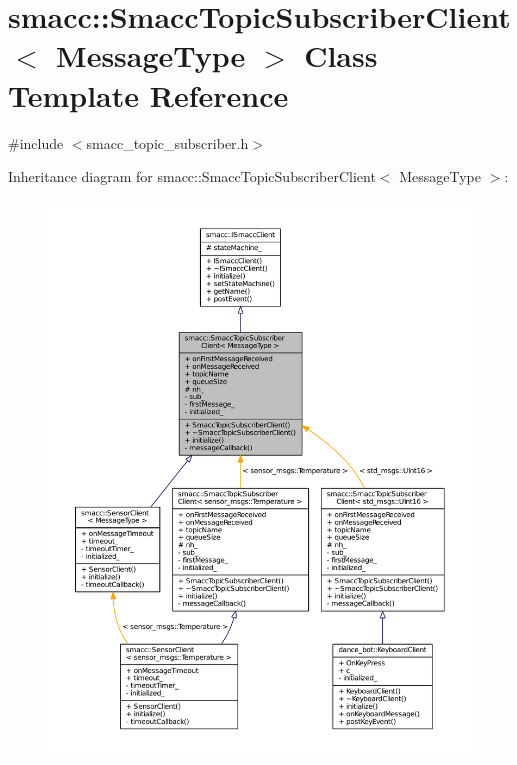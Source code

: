 \hypertarget{classsmacc_1_1SmaccTopicSubscriberClient}{}\section{smacc\+:\+:Smacc\+Topic\+Subscriber\+Client$<$ Message\+Type $>$ Class Template Reference}
\label{classsmacc_1_1SmaccTopicSubscriberClient}


{\ttfamily \#include $<$smacc\+\_\+topic\+\_\+subscriber.\+h$>$}



Inheritance diagram for smacc\+:\+:Smacc\+Topic\+Subscriber\+Client$<$ Message\+Type $>$\+:
\nopagebreak
\begin{figure}[H]
\begin{center}
\leavevmode
\includegraphics[width=350pt]{classsmacc_1_1SmaccTopicSubscriberClient__inherit__graph}
\end{center}
\end{figure}


